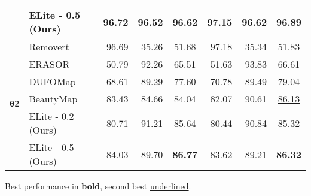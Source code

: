 \begin{table}[t!]
\begin{adjustbox}{width=1.0\linewidth}
{\begin{tabular}{c|l|rrc|rrc}
                    & ELite - 0.5 (Ours) & 96.72 & 96.52 & \textbf{96.62} & 97.15 & 96.62 & \textbf{96.89}  \\ 
                    \midrule
\multirow{6}{*}{\texttt{02}} & Removert \cite{kim2020remove}   & 96.69 & 35.26 & 51.68  & 97.18 & 35.34 & 51.83                    \\
                    & ERASOR \cite{lim2021erasor}      & 50.79 & 92.26 & 65.51  & 51.63 & 93.83 & 66.61                    \\
                    & DUFOMap \cite{duberg2024dufomap}    & 68.61 & 89.29 & 77.60  & 70.78 & 89.49 & 79.04                    \\
                    & BeautyMap \cite{jia2024beautymap}   & 83.43 & 84.66 & 84.04 & 82.07 & 90.61 & \underline{86.13}        \\
                    & ELite - 0.2 (Ours) & 80.71 & 91.21 & \underline{85.64} & 80.44 & 90.84 & 85.32        \\
                    & ELite - 0.5 (Ours) & 84.03 & 89.70 & \textbf{86.77} & 83.62 & 89.21 & \textbf{86.32}  \\ 
\bottomrule[0.8pt]
\end{tabular}
}
\end{adjustbox}
\tiny{ }

\footnotesize
\raggedright
Best performance in \textbf{bold}, second best \underline{underlined}.
\label{tab:semantic_kitti}
\vspace{-5mm}
\end{table}